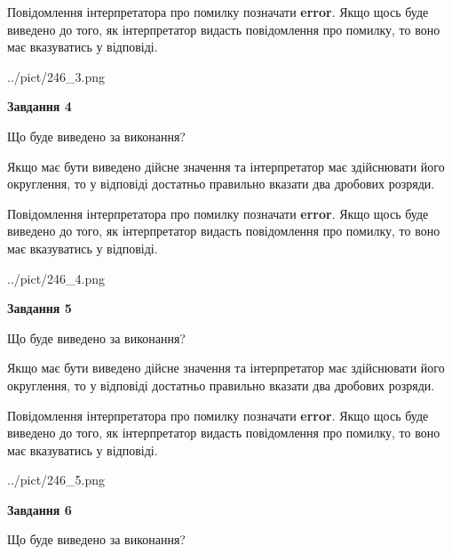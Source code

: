 \documentclass[12pt, ukrainian]{article}
\begin{document}
{\begin {Large}
Повідомлення інтерпретатора про помилку позначати \textbf{error}.
Якщо щось буде виведено до того, як інтерпретатор видасть повідомлення про помилку, 
то воно має вказуватись у відповіді. \par

\begin{center}
	{../pict/246_3.png}
\end{center}
\newpage

{\begin {center}\textbf{Завдання 4}\end {center}}\par
Що буде виведено за виконання? \par

Якщо має бути виведено дійсне значення та інтерпретатор має здійснювати його округлення, 
то у відповіді достатньо правильно вказати два дробових розряди.

Повідомлення інтерпретатора про помилку позначати \textbf{error}.
Якщо щось буде виведено до того, як інтерпретатор видасть повідомлення про помилку, 
то воно має вказуватись у відповіді. \par

\begin{center}
	{../pict/246_4.png}
\end{center}
\newpage

{\begin {center}\textbf{Завдання 5}\end {center}}\par
Що буде виведено за виконання? \par

Якщо має бути виведено дійсне значення та інтерпретатор має здійснювати його округлення, 
то у відповіді достатньо правильно вказати два дробових розряди.

Повідомлення інтерпретатора про помилку позначати \textbf{error}.
Якщо щось буде виведено до того, як інтерпретатор видасть повідомлення про помилку, 
то воно має вказуватись у відповіді. \par

\begin{center}
	{../pict/246_5.png}
\end{center}
\newpage

{\begin {center}\textbf{Завдання 6}\end {center}}\par
Що буде виведено за виконання? \par


\end{Large}}
\end{document}
